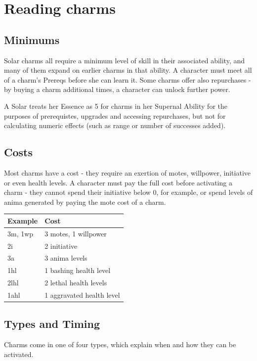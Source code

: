 \documentclass[oneside]{book}
\begin{document}
\section{Reading charms}
\begin{multicols}{2}

\subsection*{Minimums}
\par Solar charms all require a minimum level of skill in their associated ability, and many of them expand on earlier charms in that ability. A character must meet all of a charm's Prereqs before she can learn it. Some charms offer also repurchases - by buying a charm additional times, a character can unlock further power.

\par A Solar treats her Essence as 5 for charms in her Supernal Ability for the purposes of prerequistes, upgrades and accessing repurchases, but not for calculating numeric effects (such as range or number of successes added).

\subsection*{Costs}
\par Most charms have a cost - they require an exertion of motes, willpower, initiative or even health levels. A character must pay the full cost before activating a charm - they cannot spend their initiative below 0, for example, or spend levels of anima generated by paying the mote cost of a charm.

\begin{tabular}{ll}
  Example & Cost\\
  \hline
  3m, 1wp & 3 motes, 1 willpower\\
  2i & 2 initiative\\
  3a & 3 anima levels\\
  1hl & 1 bashing health level\\
  2lhl & 2 lethal health levels\\
  1ahl & 1 aggravated health level\\
\end{tabular}

\subsection*{Types and Timing}
\par Charms come in one of four types, which explain when and how they can be activated.


\end{multicols}
\end{document}
